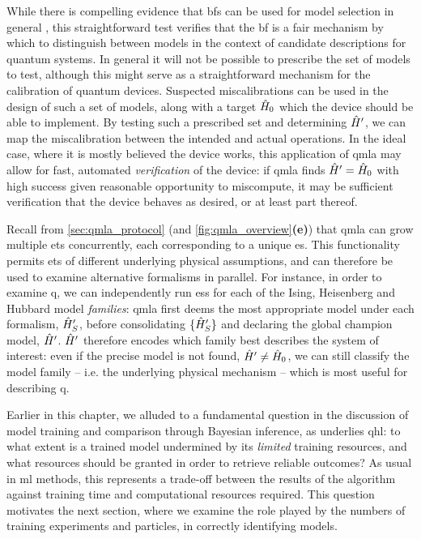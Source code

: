 While there is compelling evidence that \glspl{bf} can be used for model selection in general \cite{berger1996intrinsic}, 
this straightforward test verifies that the \gls{bf} is a fair mechanism by which to distinguish between 
models in the context of candidate descriptions for quantum systems. 
In general it will not be possible to prescribe the set of models to test, 
although this might serve as a straightforward mechanism for the calibration of quantum devices.
Suspected miscalibrations can be used in the design of such a set of models, 
along with a target $\hat{H}_0$ which the device should be able to implement. 
By testing such a prescribed set and determining $\hat{H}^{\prime}$, 
we can map the miscalibration between the intended and actual operations. 
In the ideal case, where it is mostly believed the device works, 
this application of \gls{qmla} may allow for fast, automated \emph{verification} of the device:
if \gls{qmla} finds $\hat{H}^{\prime}=\hat{H}_0$ with high success given reasonable opportunity to miscompute, 
it may be sufficient verification that the device behaves as desired, 
or at least part thereof. 



Recall from \cref{sec:qmla_protocol} (and \cref{fig:qmla_overview}\textbf{(e)}) that \gls{qmla} 
can grow multiple \glspl{et} concurrently, each corresponding to a unique \gls{es}. 
This functionality permits \glspl{et} of different underlying physical assumptions, 
and can therefore be used to examine alternative formalisms in parallel.
For instance, in order to examine \gls{q}, 
we can independently run \glspl{es} for each of the Ising, Heisenberg and Hubbard model \emph{families}:
\gls{qmla} first deems the most appropriate model under each formalism, $\hat{H}^{\prime}_S$,
before consolidating $\{\hat{H}^{\prime}_S\}$ and declaring the global \gls{champion model}, $\hat{H}^{\prime}$. 
$\hat{H}^{\prime}$ therefore encodes which family best describes the system of interest:
even if the precise model is not found, $\hat{H}^{\prime} \neq \hat{H}_0$, we can still classify the 
model family -- i.e. the underlying physical mechanism -- which is most useful for describing \gls{q}. 
\par 

Earlier in this chapter, we alluded to a fundamental question in the discussion of model training and comparison 
through Bayesian inference, as underlies \gls{qhl}:
to what extent is a trained model undermined by its \emph{limited} training resources\footnotemark, 
and what resources should be granted in order to retrieve reliable outcomes?
As usual in \gls{ml} methods, this represents a trade-off between the results of the algorithm 
against training time and computational resources required.
This question motivates the next section, 
where we examine the role played by the numbers of training \glspl{experiment} and \glspl{particle},
in correctly identifying models. 
\par


